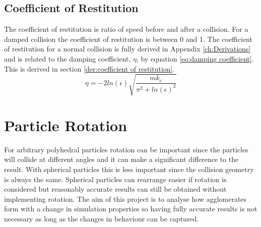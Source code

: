 \documentclass[10pt,a4paper,titlepage]{report}
\begin{document}
\subsection{Coefficient of Restitution}
The coefficient of restitution is ratio of speed before and after a collision. For a damped collision the coefficient of restitution is between 0 and 1. The coefficient of restitution for a normal collision is fully derived in Appendix \ref{ch:Derivations} and is related to the damping coefficient, $\eta$, by equation \ref{eq:damping coefficient}. This is derived in section \ref{der:coefficient of restitution}.
\begin{equation}
\eta = - 2 ln(\epsilon) \sqrt{\dfrac{m k_e}{\pi^2 + ln(\epsilon)^2}}
\label{eq:damping coefficient}
\end{equation}
\section{Particle Rotation}
For arbitrary polyhedral particles rotation can be important since the particles will collide at different angles and it can make a significant difference to the result. With spherical particles this is less important since the collision geometry is always the same. Spherical particles can rearrange easier if rotation is considered but reasonably accurate results can still be obtained without implementing rotation. The aim of this project is to analyse how agglomerates form with a change in simulation properties so having fully accurate results is not necessary as long as the changes in behaviour can be captured.
\end{document}
